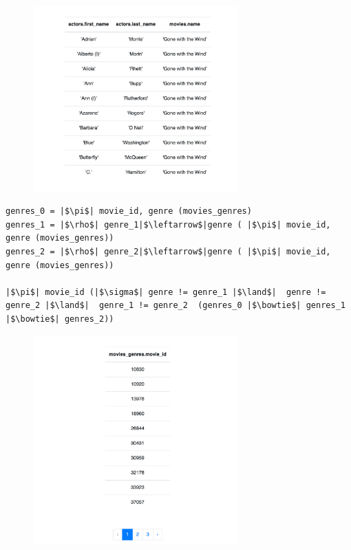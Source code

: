 \documentclass[11pt]{article}
\begin{document}
\begin{figure}[H]
\includegraphics[width=0.7\textwidth]{Parcialito3/result4}
\end{figure}

\begin{verbatim}
genres_0 = |$\pi$| movie_id, genre (movies_genres)
genres_1 = |$\rho$| genre_1|$\leftarrow$|genre ( |$\pi$| movie_id, genre (movies_genres))
genres_2 = |$\rho$| genre_2|$\leftarrow$|genre ( |$\pi$| movie_id, genre (movies_genres))

|$\pi$| movie_id (|$\sigma$| genre != genre_1 |$\land$|  genre != genre_2 |$\land$|  genre_1 != genre_2  (genres_0 |$\bowtie$| genres_1 |$\bowtie$| genres_2))
\end{verbatim}

\begin{figure}[H]
\includegraphics[width=0.7\textwidth]{Parcialito3/result5}
\end{figure}
\end{document}
